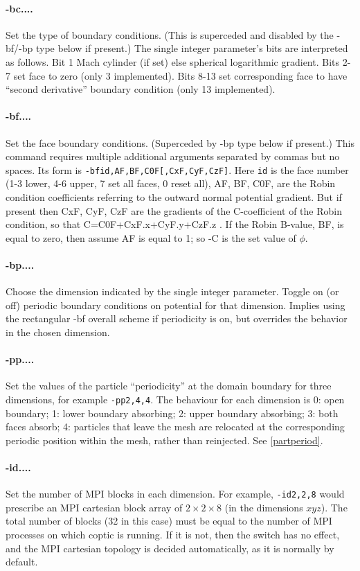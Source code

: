\documentclass[12pt]{article}
\begin{document}
\paragraph{-bc....} Set the type of boundary conditions. (This is
superceded and disabled by the -bf/-bp type below if present.) The single
integer parameter's bits are interpreted as follows.  Bit 1 Mach
cylinder (if set) else spherical logarithmic gradient.  Bits 2-7 set
face to zero (only 3 implemented). Bits 8-13 set corresponding face to
have ``second derivative'' boundary condition (only 13 implemented).

\paragraph{-bf....} Set the face boundary conditions. (Superceded by
-bp type below if present.) This command requires multiple additional
arguments separated by commas but no spaces. Its form is
\verb!-bfid,AF,BF,C0F[,CxF,CyF,CzF]!. Here \verb!id! is the face
number (1-3 lower, 4-6 upper, 7 set all faces, 0 reset all), AF, BF,
C0F, are the Robin condition coefficients referring to the outward
normal potential gradient. But if present then CxF, CyF, CzF are the
gradients of the C-coefficient of the Robin condition, so that
C=C0F+CxF.x+CyF.y+CzF.z . If the Robin B-value, BF, is equal to zero,
then assume AF is equal to 1; so -C is the set value of $\phi$.

\paragraph{-bp....} Choose the dimension indicated by the single
integer parameter. Toggle on (or off) periodic boundary conditions on
potential for that dimension. Implies using the rectangular -bf
overall scheme if periodicity is on, but overrides the behavior in the
chosen dimension.

\paragraph{-pp....} Set the values of the particle ``periodicity'' at
the domain boundary for three dimensions, for example \verb!-pp2,4,4!.
The behaviour for each dimension is 0: open boundary; 1: lower
boundary absorbing; 2: upper boundary absorbing; 3: both faces absorb;
4: particles that leave the mesh are relocated at the corresponding
periodic position within the mesh, rather than reinjected. See
\ref{partperiod}.

\paragraph{-id....} Set the number of MPI blocks in each
dimension. For example, \verb!-id2,2,8! would prescribe an MPI
cartesian block array of $2\times2\times8$ (in the dimensions $xyz$).
The total number of blocks (32 in this case) must be equal to the
number of MPI processes on which coptic is running. If it is not, then
the switch has no effect, and the MPI cartesian topology is decided
automatically, as it is normally by default.
\end{document}

